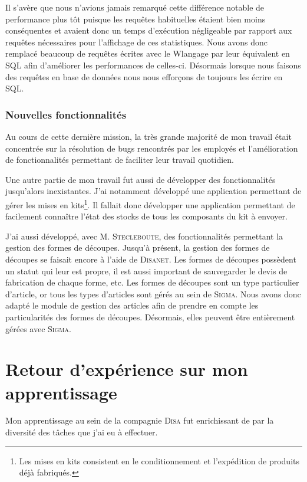 Il s'avère que nous n'avions jamais remarqué cette différence notable de performance plus tôt puisque les requêtes habituelles étaient bien moins conséquentes et avaient donc un temps d'exécution négligeable par rapport aux requêtes nécessaires pour l'affichage de ces statistiques.
Nous avons donc remplacé beaucoup de requêtes écrites avec le Wlangage par leur équivalent en SQL afin d'améliorer les performances de celles-ci.
Désormais lorsque nous faisons des requêtes en base de données nous nous efforçons de toujours les écrire en SQL.

\subsubsection{Nouvelles fonctionnalités}

Au cours de cette dernière mission, la très grande majorité de mon travail était concentrée sur la résolution de bugs rencontrés par les employés et l'amélioration de fonctionnalités permettant de faciliter leur travail quotidien.

Une autre partie de mon travail fut aussi de développer des fonctionnalités jusqu'alors inexistantes.
J'ai notamment développé une application permettant de gérer les mises en kits\footnote{Les mises en kits consistent en le conditionnement et l'expédition de produits déjà fabriqués.}.
Il fallait donc développer une application permettant de facilement connaître l'état des stocks de tous les composants du kit à envoyer.

J'ai aussi développé, avec M. \textsc{Stecleboute}, des fonctionnalités permettant la gestion des formes de découpes.
Jusqu'à présent, la gestion des formes de découpes se faisait encore à l'aide de \textsc{Disanet}.
Les formes de découpes possèdent un statut qui leur est propre, il est aussi important de sauvegarder le devis de fabrication de chaque forme, etc.
Les formes de découpes sont un type particulier d'article, or tous les types d'articles sont gérés au sein de \textsc{Sigma}.
Nous avons donc adapté le module de gestion des articles afin de prendre en compte les particularités des formes de découpes.
Désormais, elles peuvent être entièrement gérées avec \textsc{Sigma}.

\newpage
\section{Retour d'expérience sur mon apprentissage}

Mon apprentissage au sein de la compagnie \textsc{Disa} fut enrichissant de par la diversité des tâches que j'ai eu à effectuer.

